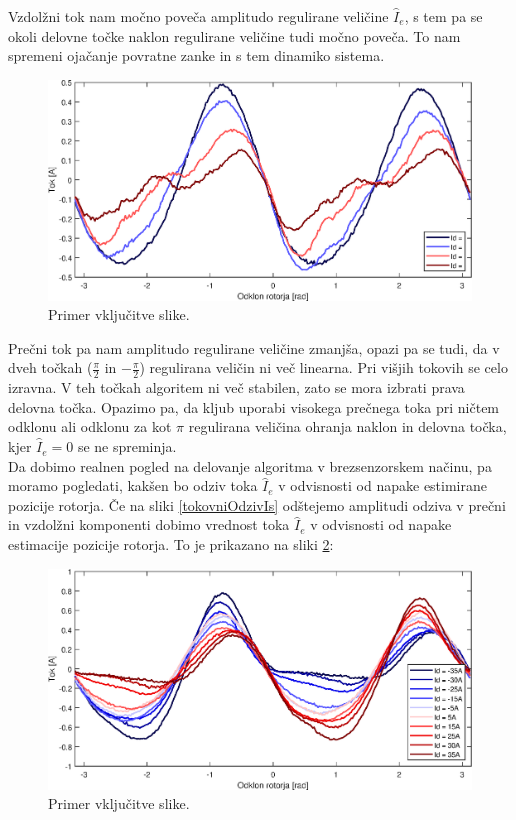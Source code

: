 \documentclass[a4paper,twoside,openright,12pt,slovene]{book}
\begin{document}
Vzdolžni tok nam močno poveča amplitudo regulirane veličine $\hat{I}_{e}$, s tem pa se okoli delovne točke naklon regulirane veličine tudi močno poveča. To nam spremeni ojačanje povratne zanke in s
tem dinamiko sistema.

\begin{figure}[!htbp]
    \centering
    \includegraphics[width=01\columnwidth]{Slike/reguliranaVelicinaIq.eps}
    \caption{\label{reguliranaVelicinaIq} Primer vključitve slike.}
\end{figure}

Prečni tok pa nam amplitudo regulirane veličine zmanjša, opazi pa se tudi, da v dveh točkah ($\frac{\pi}{2}$ in $-\frac{\pi}{2}$) regulirana veličin ni več linearna. Pri višjih tokovih se celo izravna.
V teh točkah algoritem ni več stabilen, zato se mora izbrati prava delovna točka.
Opazimo pa, da kljub uporabi visokega prečnega toka pri ničtem odklonu ali odklonu za kot $\pi$ regulirana veličina ohranja naklon in delovna točka, kjer $\hat{I}_{e} = 0$ se ne spreminja.
\\
Da dobimo realnen pogled na delovanje algoritma v brezsenzorskem načinu, pa moramo pogledati, kakšen bo odziv toka $\hat{I}_{e}$ v odvisnosti od napake estimirane pozicije rotorja. Če na sliki
\ref{tokovniOdzivIs} odštejemo amplitudi odziva v prečni in vzdolžni komponenti dobimo vrednost toka $\hat{I}_{e}$ v odvisnosti od napake estimacije pozicije rotorja. To je prikazano na sliki
\ref{reguliranaVelicinaIs}:

\begin{figure}[!htbp]
    \centering
    \includegraphics[width=1\columnwidth]{Slike/reguliranaVelicinaIs.eps}
    \caption{\label{reguliranaVelicinaIs} Primer vključitve slike.}
\end{figure}
\end{document}
